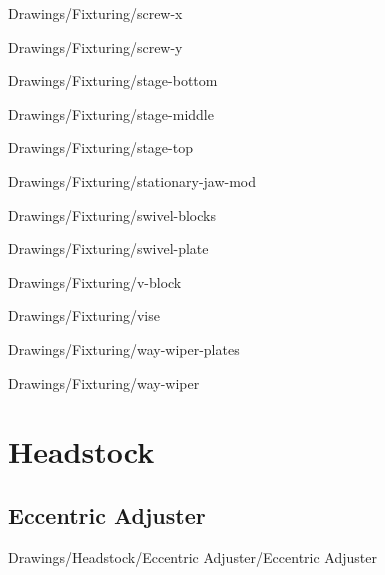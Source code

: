
{Drawings/Fixturing/screw-x}


{Drawings/Fixturing/screw-y}


{Drawings/Fixturing/stage-bottom}


{Drawings/Fixturing/stage-middle}


{Drawings/Fixturing/stage-top}


{Drawings/Fixturing/stationary-jaw-mod}


{Drawings/Fixturing/swivel-blocks}


{Drawings/Fixturing/swivel-plate}


{Drawings/Fixturing/v-block}


{Drawings/Fixturing/vise}


{Drawings/Fixturing/way-wiper-plates}


{Drawings/Fixturing/way-wiper}

\section{Headstock}

\subsection{Eccentric Adjuster}


{Drawings/Headstock/Eccentric Adjuster/Eccentric Adjuster}

